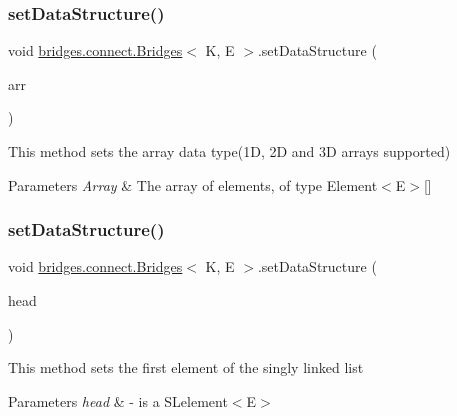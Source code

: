 \subsubsection{\texorpdfstring{set\+Data\+Structure()}{setDataStructure()}\hspace{0.1cm}{\footnotesize\ttfamily [2/12]}}
{\footnotesize\ttfamily void \hyperlink{classbridges_1_1connect_1_1_bridges}{bridges.\+connect.\+Bridges}$<$ K, E $>$.set\+Data\+Structure (\begin{DoxyParamCaption}\item[{\hyperlink{classbridges_1_1base_1_1_array}{Array}$<$ E $>$}]{arr }\end{DoxyParamCaption})}

This method sets the array data type(1\+D, 2\+D and 3\+D arrays supported)


\begin{DoxyParams}{Parameters}
{\em Array} & The array of elements, of type Element$<$\+E$>$\mbox{[}\mbox{]} \\
\hline
\end{DoxyParams}
\hypertarget{classbridges_1_1connect_1_1_bridges_ae41b3d86963350ace304d8951c1863ad}{}\label{classbridges_1_1connect_1_1_bridges_ae41b3d86963350ace304d8951c1863ad} 
\subsubsection{\texorpdfstring{set\+Data\+Structure()}{setDataStructure()}\hspace{0.1cm}{\footnotesize\ttfamily [3/12]}}
{\footnotesize\ttfamily void \hyperlink{classbridges_1_1connect_1_1_bridges}{bridges.\+connect.\+Bridges}$<$ K, E $>$.set\+Data\+Structure (\begin{DoxyParamCaption}\item[{\hyperlink{classbridges_1_1base_1_1_s_lelement}{S\+Lelement}$<$ E $>$}]{head }\end{DoxyParamCaption})}

This method sets the first element of the singly linked list 
\begin{DoxyParams}{Parameters}
{\em head} & -\/ is a S\+Lelement$<$\+E$>$ \\
\hline
\end{DoxyParams}
\hypertarget{classbridges_1_1connect_1_1_bridges_a383877f85bb048d47560e76f359e1bda}{}\label{classbridges_1_1connect_1_1_bridges_a383877f85bb048d47560e76f359e1bda} 
